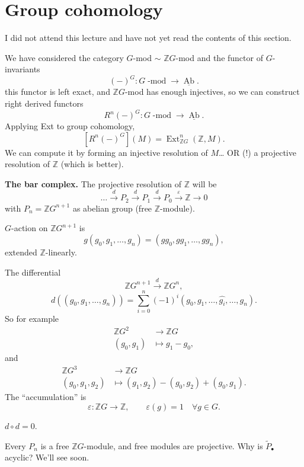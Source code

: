 \section{Group cohomology}
\label{section-group-cohomology}

\noindent
I did not attend this lecture and have not yet read the contents of this section.

\noindent
We have considered the category
$G$-mod $\sim$ $\mathbb{Z}G$-mod and the
functor of $G$-invariants
$$
(-)^G : G\operatorname{-mod}
\to
\underline{\operatorname{Ab}}.
$$
this functor is left exact, and
$\mathbb{Z}G$-mod has enough injectives,
so we can construct right derived functors
$$
R^n(-)^G: G\operatorname{-mod}
\to \underline{\operatorname{Ab}}.
$$
\medskip\noindent
Applying Ext to group cohomology,
$$
[R^n(-)^G](M)
=
\operatorname{Ext}^n_{\mathbb{Z} G}
(\mathbb{Z},M).
$$
We can compute it by forming an injective
resolution of $M$… OR (!)
a projective resolution of $\mathbb{Z}$
(which is better).



\medskip\noindent
{\bf The bar complex.}
The projective resolution of $\mathbb{Z}$
will be
$$
… \xrightarrow{d}P_2
\xrightarrow{d}P_1
\xrightarrow{d}P_0
\xrightarrow{\varepsilon}
\mathbb{Z}\to 0
$$
with $P_n=\mathbb{Z}G^{n+1}$
as abelian group (free $\mathbb{Z}$-module).

$G$-action on $\mathbb{Z}G^{n+1}$ is
$$
g(g_0,g_1,…,g_n)
=
(gg_0, g g_1,…,g g_n),
$$
extended $\mathbb{Z}$-linearly.

The differential
$$
\mathbb{Z}G^{n+1}
\xrightarrow{d}
\mathbb{Z}G^n,
$$
$$
d((g_0,g_1,…,g_n))
=
\sum_{i=0}^n
(-1)^i(g_0,g_1,…,\widehat{g_i},…,g_n).
$$
So for example
$$
\begin{aligned}
\mathbb{Z}G^2 &\longrightarrow \mathbb{Z}G \\
(g_0,g_1) &\longmapsto g_1-g_0,
\end{aligned}
$$
and
$$
\begin{aligned}
\mathbb{Z}G^3 &\longrightarrow \mathbb{Z}G \\
(g_0,g_1,g_2) &\longmapsto 
(g_1,g_2)-(g_0,g_2)+(g_0,g_1).
\end{aligned}
$$
The ``accumulation'' is
$$
\varepsilon:\mathbb{Z}G \to \mathbb{Z},
\qquad 
\varepsilon(g)=1 \quad \forall g \in G.
$$
\begin{exercise}
\label{exercise-bar-complex}
$d \circ d=0$.
\end{exercise}

\begin{remark}
\label{remark-bar}
Every $P_n$ is a free $\mathbb{Z}G$-module,
and free modules are projective.
Why is $\tilde{P}_\bullet$
acyclic? We'll see soon.
\end{remark}

